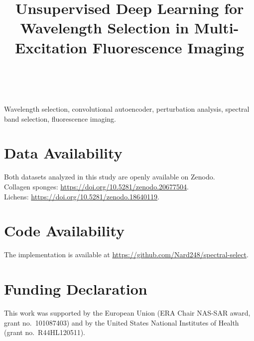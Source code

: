\documentclass[journal]{IEEEtran}
\begin{document}
\title{Unsupervised Deep Learning for Wavelength Selection in Multi-Excitation Fluorescence Imaging}

\author{
\\
}

\maketitle



\begin{IEEEkeywords}
Wavelength selection, convolutional autoencoder, perturbation analysis, spectral band selection, fluorescence imaging.
\end{IEEEkeywords}









\section*{Data Availability}
Both datasets analyzed in this study are openly available on Zenodo. 
\\ 
Collagen sponges: \url{https://doi.org/10.5281/zenodo.20677504}. 
\\
Lichens: \url{https://doi.org/10.5281/zenodo.18640119}.

\section*{Code Availability}
The implementation is available at \url{https://github.com/Nard248/spectral-select}.

\section*{Funding Declaration}
This work was supported by the European Union (ERA Chair NAS-SAR award, grant no.\ 101087403) and by the United States National Institutes of Health (grant no.\ R44HL120511).
\end{document}
